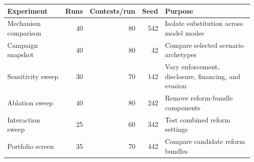 \begingroup
\begin{center}
\begin{minipage}{\textwidth}
\centering
\footnotesize
\setlength{\tabcolsep}{3pt}
\begin{tabular*}{\textwidth}{@{\extracolsep{\fill}}lrrrl@{}}
\toprule
Experiment & Runs & Contests/run & Seed & Purpose \\
\midrule
Mechanism comparison & 40 & 80 & 542 & Isolate substitution across model modes \\
Campaign snapshot & 40 & 80 & 42 & Compare selected scenario archetypes \\
Sensitivity sweep & 30 & 70 & 142 & Vary enforcement, disclosure, financing, and evasion \\
Ablation sweep & 40 & 80 & 242 & Remove reform-bundle components \\
Interaction sweep & 25 & 60 & 342 & Test combined reform settings \\
Portfolio screen & 35 & 70 & 442 & Compare candidate reform bundles \\
\bottomrule
\end{tabular*}
\par\smallskip
\captionsetup{hypcap=false}
\label{tab:experiment-design}
\end{minipage}
\end{center}
\endgroup

